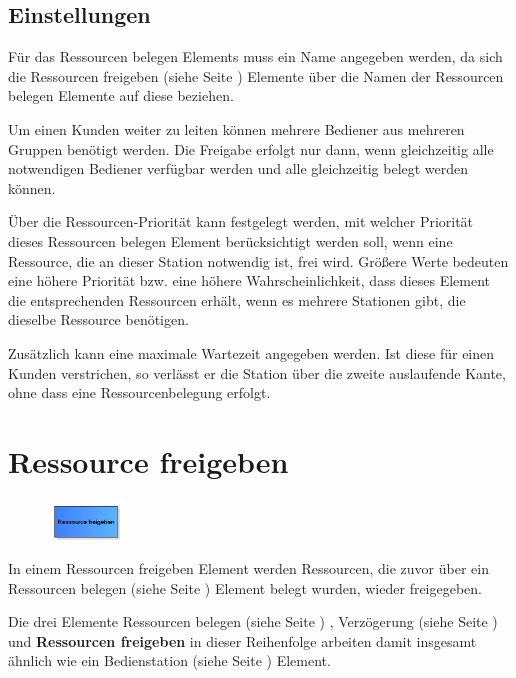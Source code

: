 \subsection*{Einstellungen}

Für das Ressourcen belegen Elements muss ein Name angegeben werden, da sich die
Ressourcen freigeben (siehe Seite \pageref{ref:ModelElementRelease}) Elemente über die Namen
der Ressourcen belegen Elemente auf diese beziehen.

Um einen Kunden weiter zu leiten können mehrere Bediener aus mehreren Gruppen benötigt werden. Die Freigabe erfolgt
nur dann, wenn gleichzeitig alle notwendigen Bediener verfügbar werden und alle gleichzeitig belegt werden können.

Über die Ressourcen-Priorität kann festgelegt werden, mit welcher Priorität dieses Ressourcen belegen Element
berücksichtigt werden soll, wenn eine Ressource, die an dieser Station notwendig ist,
frei wird. Größere Werte bedeuten eine höhere Priorität bzw. eine höhere Wahrscheinlichkeit, dass dieses Element
die entsprechenden Ressourcen erhält, wenn es mehrere Stationen gibt, die dieselbe Ressource benötigen.

Zusätzlich kann eine maximale Wartezeit angegeben werden. Ist diese für einen Kunden verstrichen,
so verlässt er die Station über die zweite auslaufende Kante, ohne dass eine Ressourcenbelegung erfolgt.


\section{Ressource freigeben}
\label{ref:ModelElementRelease}

\begin{figure}
\vspace{-22pt}
\includegraphics[width=2cm]{imageModelElementRelease.png}
\vspace{-22pt}
\end{figure}

In einem Ressourcen freigeben Element werden Ressourcen, die zuvor über ein Ressourcen belegen (siehe Seite \pageref{ref:ModelElementSeize}) 
Element belegt wurden, wieder freigegeben.

Die drei Elemente Ressourcen belegen (siehe Seite \pageref{ref:ModelElementSeize}) , Verzögerung (siehe Seite \pageref{ref:ModelElementDelay}) und
\textbf{Ressourcen freigeben} in dieser Reihenfolge arbeiten damit
insgesamt ähnlich wie ein Bedienstation (siehe Seite \pageref{ref:ModelElementProcess}) Element.

